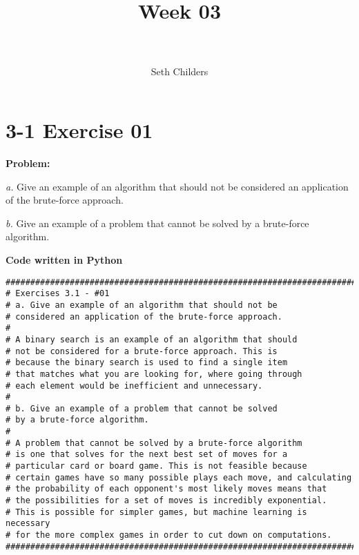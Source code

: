 \documentclass[paper=a4, fontsize=11pt]{scrartcl} %
\title{	
\normalfont \normalsize 
\horrule{0.5pt} \\[0.4cm] %
\huge Week 03 \\ %
\horrule{2pt} \\[0.5cm] %
}
\author{Seth Childers} %
\date{} %
\numberwithin{equation}{section}
\numberwithin{figure}{section}
\numberwithin{table}{section}
\begin{document}
\maketitle %


\section{3-1 Exercise 01}

\textbf{Problem:}

\textit{a.} Give an example of an algorithm that should not be considered an application of the brute-force approach.

\textit{b.} Give an example of a problem that cannot be solved by a brute-force algorithm.

\bigskip
\textbf{Code written in Python}
\begin{lstlisting}
#######################################################################
# Exercises 3.1 - #01
# a. Give an example of an algorithm that should not be 
# considered an application of the brute-force approach.
#
# A binary search is an example of an algorithm that should
# not be considered for a brute-force approach. This is
# because the binary search is used to find a single item
# that matches what you are looking for, where going through
# each element would be inefficient and unnecessary. 
#
# b. Give an example of a problem that cannot be solved
# by a brute-force algorithm.
#
# A problem that cannot be solved by a brute-force algorithm
# is one that solves for the next best set of moves for a 
# particular card or board game. This is not feasible because
# certain games have so many possible plays each move, and calculating
# the probability of each opponent's most likely moves means that
# the possibilities for a set of moves is incredibly exponential.
# This is possible for simpler games, but machine learning is necessary
# for the more complex games in order to cut down on computations.
#######################################################################
\end{lstlisting}
\pagebreak

\end{document}
